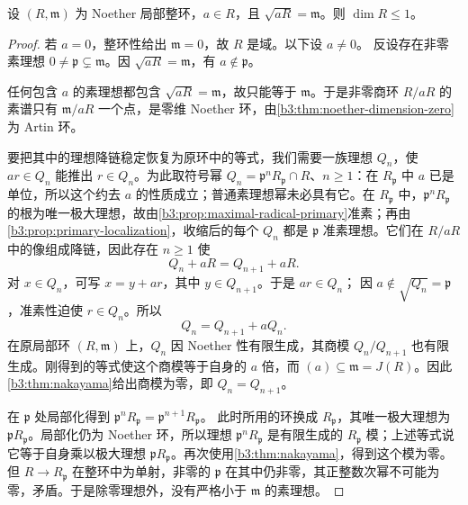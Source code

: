 \begin{lemma}\label{b3:lem:principal-primary-local-domain}
	设 \((R,\mathfrak m)\) 为 Noether 局部整环，\(a\in R\)，且 \(\sqrt{aR}=\mathfrak m\)。则 \(\dim R\le1\)。
\end{lemma}
\begin{proof}
	若 \(a=0\)，整环性给出 \(\mathfrak m=0\)，故 \(R\) 是域。以下设 \(a\ne0\)。 反设存在非零素理想 \(0\ne\mathfrak p\subsetneq\mathfrak m\)。因 \(\sqrt{aR}=\mathfrak m\)，有 \(a\notin\mathfrak p\)。

	任何包含 \(a\) 的素理想都包含 \(\sqrt{aR}=\mathfrak m\)，故只能等于 \(\mathfrak m\)。于是非零商环 \(R/aR\) 的素谱只有 \(\mathfrak m/aR\) 一个点，是零维 Noether 环，由\cref{b3:thm:noether-dimension-zero}为 Artin 环。

	要把其中的理想降链稳定恢复为原环中的等式，我们需要一族理想 \(Q_n\)，使 \(ar\in Q_n\) 能推出 \(r\in Q_n\)。为此取符号幂 \(Q_n=\mathfrak p^nR_{\mathfrak p}\cap R\)、\(n\ge1\)：在 \(R_{\mathfrak p}\) 中 \(a\) 已是单位，所以这个约去 \(a\) 的性质成立；普通素理想幂未必具有它。在 \(R_{\mathfrak p}\) 中，\(\mathfrak p^nR_{\mathfrak p}\) 的根为唯一极大理想，故由\cref{b3:prop:maximal-radical-primary}准素；再由\cref{b3:prop:primary-localization}，收缩后的每个 \(Q_n\) 都是 \(\mathfrak p\) 准素理想。它们在 \(R/aR\) 中的像组成降链，因此存在 \(n\ge1\) 使
	\[
		Q_n+aR=Q_{n+1}+aR.
	\]
	对 \(x\in Q_n\)，可写 \(x=y+ar\)，其中 \(y\in Q_{n+1}\)。于是 \(ar\in Q_n\)； 因 \(a\notin\sqrt{Q_n}=\mathfrak p\)，准素性迫使 \(r\in Q_n\)。所以
	\[
		Q_n=Q_{n+1}+aQ_n.
	\]
	在原局部环 \((R,\mathfrak m)\) 上，\(Q_n\) 因 Noether 性有限生成，其商模 \(Q_n/Q_{n+1}\) 也有限生成。刚得到的等式使这个商模等于自身的 \(a\) 倍，而 \((a)\subseteq\mathfrak m=J(R)\)。因此\cref{b3:thm:nakayama}给出商模为零，即 \(Q_n=Q_{n+1}\)。

	在 \(\mathfrak p\) 处局部化得到 \(\mathfrak p^nR_{\mathfrak p}=\mathfrak p^{n+1}R_{\mathfrak p}\)。 此时所用的环换成 \(R_{\mathfrak p}\)，其唯一极大理想为 \(\mathfrak pR_{\mathfrak p}\)。局部化仍为 Noether 环，所以理想 \(\mathfrak p^nR_{\mathfrak p}\) 是有限生成的 \(R_{\mathfrak p}\) 模；上述等式说它等于自身乘以极大理想 \(\mathfrak pR_{\mathfrak p}\)。再次使用\cref{b3:thm:nakayama}，得到这个模为零。但 \(R\to R_{\mathfrak p}\) 在整环中为单射，非零的 \(\mathfrak p\) 在其中仍非零，其正整数次幂不可能为零，矛盾。于是除零理想外，没有严格小于 \(\mathfrak m\) 的素理想。
\end{proof}

